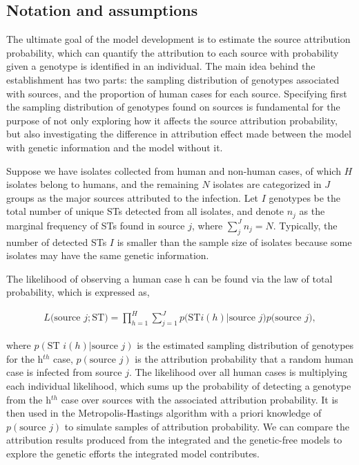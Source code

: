 \documentclass[times, doublespace]{WileyNJD-v2}%
\begin{document}
\subsection{Notation and assumptions}
The ultimate goal of the model development is to estimate the source attribution probability, which can quantify the attribution to each source with probability given a genotype is identified in an individual. The main idea behind the establishment has two parts: the sampling distribution of genotypes associated with sources, and the proportion of human cases for each source. Specifying first the sampling distribution of genotypes found on sources is fundamental for the purpose of not only exploring how it affects the source attribution probability, but also investigating the difference in attribution effect made between the model with genetic information and the model without it. 

Suppose we have isolates collected from human and non-human cases, of which $H$ isolates belong to humans, and the remaining $N$ isolates are categorized in $J$ groups as the major sources attributed to the infection. Let $I$ genotypes be the total number of unique STs detected from all isolates, and denote $n_j$ as the marginal frequency of STs found in source $j$, where $\sum_j^J n_j = N$. Typically, the number of detected STs $I$ is smaller than the sample size of isolates because some isolates may have the same genetic information.

The likelihood of observing a human case h can be found via the law of total probability, which is expressed as,

\begin{align}
  L\Big(\text{source }j; \text{ST} \Big)=\prod_{h=1}^{H}\sum_{j=1}^{J} p\Big(\text{ST}i(h) \vert \text{source } j\Big) p\Big(\text{source }j\Big),
  \label{Olikh}
\end{align}

where $p(\text{ST }i(h)\vert \text{source }j)$ is the estimated sampling distribution of genotypes for the h$^{th}$ case, $p(\text{source }j)$ is the attribution probability that a random human case is infected from source $j$. The likelihood over all human cases is multiplying each individual likelihood, which sums up the probability of detecting a genotype from the h$^{th}$ case over sources with the associated attribution probability. It is then used in the Metropolis-Hastings algorithm with a priori knowledge of $p(\text{source }j)$ to simulate samples of attribution probability. We can compare the attribution results produced from the integrated and the genetic-free models to explore the genetic efforts the integrated model contributes.
\end{document}
